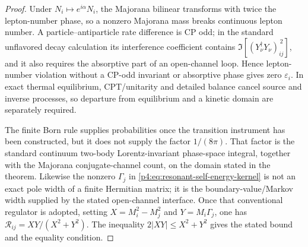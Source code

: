\documentclass[12pt,a4paper]{article}
\begin{document}
\begin{proof}
Under \(N_i\mapsto e^{i\alpha}N_i\), the Majorana bilinear transforms with
twice the lepton-number phase, so a nonzero Majorana mass breaks continuous
lepton number.  A particle--antiparticle rate difference is CP odd; in the
standard unflavored decay calculation its interference coefficient contains
\(\Im[(Y_\nu^\dagger Y_\nu)_{ij}^{\,2}]\), and it also requires the absorptive
part of an open-channel loop.  Hence lepton-number violation without a CP-odd
invariant or absorptive phase gives zero \(\varepsilon_i\).  In exact thermal
equilibrium, CPT/unitarity and detailed balance cancel source and inverse
processes, so departure from equilibrium and a kinetic domain are separately
required.

The finite Born rule supplies probabilities once the transition instrument
has been constructed, but it does not supply the factor \(1/(8\pi)\).
That factor is the standard continuum two-body Lorentz-invariant phase-space
integral, together with the Majorana conjugate-channel count, on the domain
stated in the theorem.  Likewise the nonzero \(\Gamma_j\) in
\eqref{p4:eq:resonant-self-energy-kernel} is not an exact pole width of a
finite Hermitian matrix; it is the boundary-value/Markov width supplied by
the stated open-channel interface.  Once that conventional regulator is
adopted, setting
\(X=M_i^2-M_j^2\) and \(Y=M_i\Gamma_j\), one has
\(\mathcal R_{ij}=XY/(X^2+Y^2)\).  The inequality
\(2|XY|\le X^2+Y^2\) gives the stated bound and the equality condition.
\end{proof}
\end{document}
